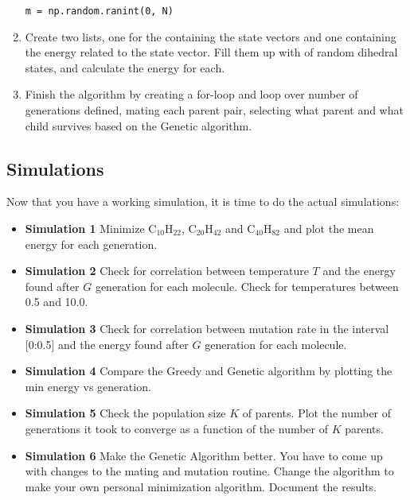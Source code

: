 \documentclass{article}
\begin{document}
\begin{enumerate}
\begin{lstlisting}
m = np.random.ranint(0, N)
\end{lstlisting}

    \item Create two lists, one for the containing the state vectors
    and one containing the energy related to the state vector.
    Fill them up with  of random dihedral states,
    and calculate the energy for each.

    \item Finish the algorithm by creating a for-loop and loop over
    number of generations defined,
    mating each parent pair, selecting what parent and what child
    survives based on the Genetic algorithm.

\end{enumerate}


\subsection{Simulations}

Now that you have a working simulation, it is time to do the actual simulations:

\begin{itemize}
    \item {\bf Simulation 1}\newline
      Minimize
      C$_{10}$H$_{22}$,
      C$_{20}$H$_{42}$ and
      C$_{40}$H$_{82}$
      and plot the mean energy for
      each generation.

    \item {\bf Simulation 2}\newline
      Check for correlation between temperature $T$ and the energy found after $G$ generation for each molecule.
      Check for temperatures between 0.5 and 10.0.

    \item {\bf Simulation 3}\newline
      Check for correlation between mutation rate in the interval [0:0.5] and the energy found after $G$ generation for each molecule.

    \item {\bf Simulation 4}\newline
      Compare the Greedy and Genetic algorithm by plotting the min energy vs generation.

    \item {\bf Simulation 5}\newline
      Check the population size $K$ of parents.
      Plot the number of generations it took to converge as a function of the number of $K$ parents.

    \item {\bf Simulation 6}\newline
      Make the Genetic Algorithm better.
      You have to come up with changes to the mating and mutation routine.
      Change the algorithm to make your own personal minimization algorithm.
      Document the results.


\end{itemize}



\end{document}

